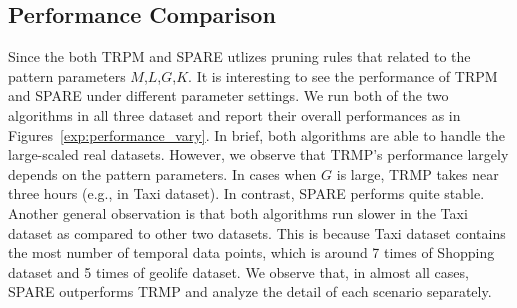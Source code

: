 \subsection{Performance Comparison}
Since the both TRPM and SPARE utlizes pruning rules that related to the 
pattern parameters $M$,$L$,$G$,$K$. It is interesting to
see the performance of TRPM and SPARE under different parameter settings.
%
We run both of the two algorithms in all three dataset and report
their overall performances as in Figures~\ref{exp:performance_vary}.
In brief, both algorithms are able to handle the large-scaled real
datasets. However, we observe that TRMP's performance largely depends
on the pattern parameters. In cases when $G$ is large, 
TRMP takes near three hours (e.g., in Taxi dataset).
In contrast, SPARE performs quite stable. Another general observation
is that both algorithms run slower in the Taxi dataset as compared to
other two datasets. This is because Taxi dataset contains
the most number of temporal data points, which is around 7 times of Shopping
dataset and 5 times of geolife dataset. We observe that, 
in almost all cases, SPARE outperforms TRMP and analyze the detail
of each scenario separately.

